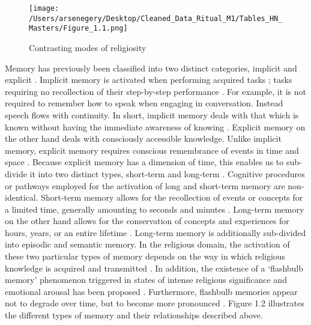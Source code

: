 \documentclass[12pt]{report}
\begin{document}
	\begin{figure}[htbp]
		\centering
		\texttt{[image: /Users/arsenegery/Desktop/Cleaned\_Data\_Ritual\_M1/Tables\_HN\_Masters/Figure\_1.1.png]} %
		\caption{Contrasting modes of religiosity \cite{whitehouse2004modes}}
		\label{fig:table1}
	\end{figure}

	\noindent Memory has previously been classified into two distinct categories, implicit and explicit \cite{graf1985}\cite{whitehouse2002}\cite{whitehouse2002a}. Implicit memory is activated when performing acquired tasks ; tasks requiring no recollection of their step-by-step performance \cite{whitehouse2004modes}. For example, it is not required to remember how to speak when engaging in conversation. Instead speech flows with continuity. In short, implicit memory deals with that which is known without having the immediate awareness of knowing \cite{whitehouse2002a}. Explicit memory on the other hand deals with consciously accessible knowledge. Unlike implicit memory, explicit memory requires conscious remembrance of events in time and space \cite{boyer1993cognitive}\cite{boyer2023naturalness}. Because explicit memory has a dimension of time, this enables us to sub-divide it into two distinct types, short-term and long-term \cite{whitehouse2005}. Cognitive procedures or pathways employed for the activation of long and short-term memory are non-identical. Short-term memory allows for the recollection of events or concepts for a limited time, generally amounting to seconds and minutes \cite{whitehouse2004modes}. Long-term memory on the other hand allows for the conservation of concepts and experiences for hours, years, or an entire lifetime \cite{whitehouse2004modes}. Long-term memory is additionally sub-divided into episodic and semantic memory. In the religious domain, the activation of these two particular types of memory depends on the way in which religious knowledge is acquired and transmitted \cite{boyer2023naturalness}\cite{boyer2007religion}\cite{whitehouse2005}\cite{whitehouse2004a}\cite{whitehouse1992}\cite{whitehouse2000}\cite{whitehouse2004modes}. In addition, the existence of a ‘flashbulb memory’ phenomenon triggered in states of intense religious significance and emotional arousal has been proposed \cite{whitehouse2002}\cite{whitehouse2004modes}. Furthermore, flashbulb memories appear not to degrade over time, but to become more pronounced \cite{whitehouse2002}. Figure 1.2 illustrates the different types of memory and their relationships described above.\\
	
\end{document}
